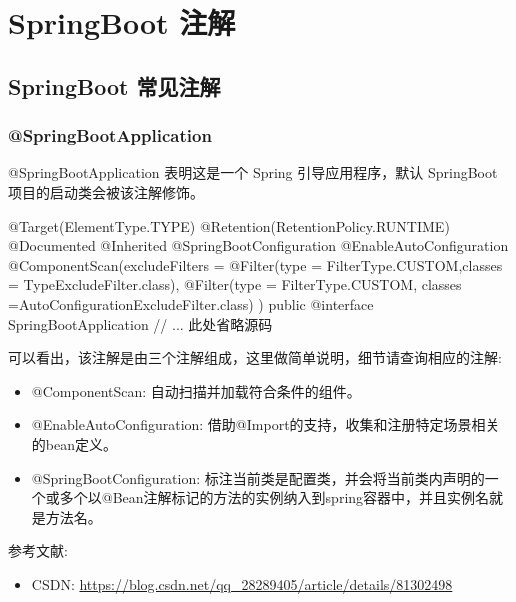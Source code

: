\section{SpringBoot 注解}
\subsection{SpringBoot 常见注解}
\subsubsection{@SpringBootApplication}

@SpringBootApplication 表明这是一个 Spring 引导应用程序，默认 SpringBoot 项目的启动类会被该注解修饰。

\begin{Java}
@Target(ElementType.TYPE)
@Retention(RetentionPolicy.RUNTIME)
@Documented
@Inherited
@SpringBootConfiguration
@EnableAutoConfiguration
@ComponentScan(excludeFilters = { 
    @Filter(type = FilterType.CUSTOM,classes = TypeExcludeFilter.class), 
    @Filter(type = FilterType.CUSTOM, classes =AutoConfigurationExcludeFilter.class) })
public @interface SpringBootApplication {
    // ... 此处省略源码
}
\end{Java}

可以看出，该注解是由三个注解组成，这里做简单说明，细节请查询相应的注解:
\begin{itemize}
    \item @ComponentScan: 自动扫描并加载符合条件的组件。
    \item @EnableAutoConfiguration: 借助@Import的支持，收集和注册特定场景相关的bean定义。
    \item @SpringBootConfiguration: 标注当前类是配置类，并会将当前类内声明的一个或多个以@Bean注解标记的方法的实例纳入到spring容器中，并且实例名就是方法名。
\end{itemize}

参考文献:
\begin{itemize}
    \item CSDN: \url{https://blog.csdn.net/qq_28289405/article/details/81302498}
\end{itemize}

\newpage